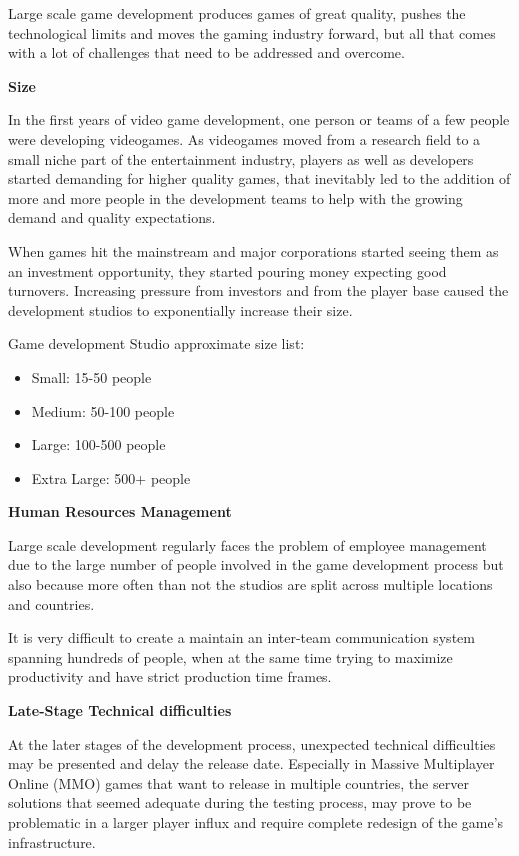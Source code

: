 \documentclass[a4paper,one side,12pt]{book}
\begin{document}
Large scale game development produces games of great quality, pushes the
technological limits and moves the gaming industry forward, but all that
comes with a lot of challenges that need to be addressed and overcome.

\textbf{{Size}}

In the first years of video game development, one person or teams of a
few people were developing videogames. As videogames moved from a
research field to a small niche part of the entertainment industry,
players as well as developers started demanding for higher quality
games, that inevitably led to the addition of more and more people in
the development teams to help with the growing demand and quality
expectations.

When games hit the mainstream and major corporations started seeing them
as an investment opportunity, they started pouring money expecting good
turnovers. Increasing pressure from investors and from the player base
caused the development studios to exponentially increase their size.

Game development Studio approximate size list:

\begin{itemize}
\item
  Small: 15-50 people
\item
  Medium: 50-100 people
\item
  Large: 100-500 people
\item
  Extra Large: 500+ people
\end{itemize}

\textbf{{Human Resources Management}}

Large scale development regularly faces the problem of employee
management due to the large number of people involved in the game
development process but also because more often than not the studios are
split across multiple locations and countries.

It is very difficult to create a maintain an inter-team communication
system spanning hundreds of people, when at the same time trying to
maximize productivity and have strict production time frames.

\textbf{{Late-Stage Technical difficulties}}

At the later stages of the development process, unexpected technical
difficulties may be presented and delay the release date. Especially in
Massive Multiplayer Online (MMO) games that want to release in multiple
countries, the server solutions that seemed adequate during the testing
process, may prove to be problematic in a larger player influx and
require complete redesign of the game's infrastructure.
\end{document}
